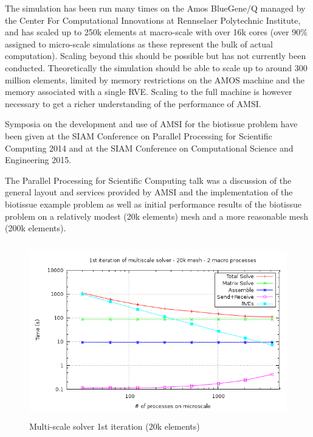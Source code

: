 The simulation has been run many times on the Amos BlueGene/Q managed by the Center For Computational Innovations at Rennselaer Polytechnic Institute, and has scaled up to 250k elements at macro-scale with over 16k cores (over 90\% assigned to micro-scale simulations as these represent the bulk of actual computation). Scaling beyond this should be possible but has not currently been conducted. Theoretically the simulation should be able to scale up to around 300 million elements, limited by memory restrictions on the AMOS machine and the memory associated with a single RVE. Scaling to the full machine is however necessary to get a richer understanding of the performance of AMSI.

Symposia on the development and use of AMSI for the biotissue problem have been given at the SIAM Conference on Parallel Processing for Scientific Computing 2014 and at the SIAM Conference on Computational Science and Engineering 2015.

The Parallel Processing for Scientific Computing talk \cite{wtobin2014pp} was a discussion of the general layout and services provided by AMSI and the implementation of the biotissue example problem as well as initial performance results of the biotissue problem on a relatively modest (20k elements) mesh and a more reasonable mesh (200k elements).

\begin{figure}
  \begin{center}
    \includegraphics[height=3in]{allTimes_2macro_20k.png}
  \end{center}
  \caption{\small Multi-scale solver 1st iteration (20k elements)}
  \label{20k_first_iteration}
\end{figure}

